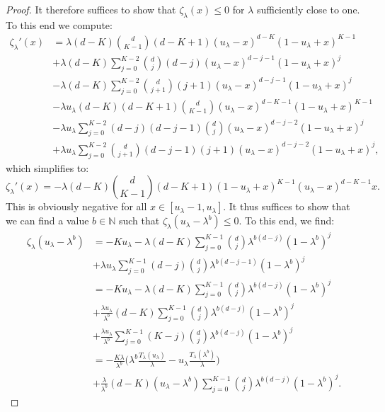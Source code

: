 \documentclass[12pt]{report}
\begin{document}
\begin{proof}
It therefore suffices to show that $\zeta_\lambda(x) \leq 0$ for $\lambda$ sufficiently close to one. To this end we compute:
\begin{align*}
\zeta_\lambda'(x)
&= \lambda (d-K) \binom{d}{K-1} (d-K+1) (u_\lambda - x)^{d-K} (1-u_\lambda+x)^{K-1}\\
&+ \lambda (d-K) \sum_{j=0}^{K-2} \binom{d}{j} (d-j) (u_\lambda - x)^{d-j-1} (1-u_\lambda + x)^j\\
&-\lambda (d-K) \sum_{j=0}^{K-2} \binom{d}{j+1} (j+1) (u_\lambda - x)^{d-j-1} (1-u_\lambda + x)^{j}\\
&- \lambda u_\lambda (d-K) (d-K+1) \binom{d}{K-1} (u_\lambda - x)^{d-K-1} (1-u_\lambda+x)^{K-1}\\
&-\lambda u_\lambda \sum_{j=0}^{K-2} (d-j) (d-j-1) \binom{d}{j} (u_\lambda -x)^{d-j-2} (1-u_\lambda+x)^j\\
&+ \lambda u_{\lambda} \sum_{j=0}^{K-2} \binom{d}{j+1} (d-j-1) (j+1) (u_\lambda - x)^{d-j-2} (1-u_\lambda +x)^j,
\end{align*}
which simplifies to:
\begin{equation} \label{eq:DzetaLam}
\zeta_\lambda'(x)=-\lambda (d-K) \binom{d}{K-1} (d-K+1) (1-u_\lambda+x)^{K-1} (u_\lambda-x)^{d-K-1} x.
\end{equation}
This is obviously negative for all $x \in [u_\lambda-1,u_\lambda]$. It thus suffices to show that we can find a value $b \in \mathbb{N}$ such that $\zeta_\lambda(u_\lambda-\lambda^b) \leq 0$. To this end, we find:
\begin{align*}
\zeta_\lambda(u_\lambda-\lambda^b)
&= -K u_\lambda - \lambda(d-K) \sum_{j=0}^{K-1} \binom{d}{j} \lambda^{b(d-j)} (1-\lambda^b)^j\\
&+\lambda u_\lambda \sum_{j=0}^{K-1} (d-j)  \binom{d}{j} \lambda^{b(d-j-1)} (1-\lambda^b)^j\\
&= -K u_\lambda - \lambda (d-K) \sum_{j=0}^{K-1} \binom{d}{j} \lambda^{b(d-j)} (1-\lambda^b)^j\\
&+ \frac{\lambda u_\lambda}{\lambda^b} (d-K) \sum_{j=0}^{K-1} \binom{d}{j} \lambda^{b(d-j)} (1-\lambda^b)^j\\
&+\frac{\lambda u_{\lambda}}{\lambda^b} \sum_{j=0}^{K-1} (K-j) \binom{d}{j} \lambda^{b(d-j)} (1-\lambda^b)^j\\
&= -\frac{K\lambda}{\lambda^b} \big(\lambda^b \frac{T_\lambda(u_\lambda)}{\lambda} - u_\lambda \frac{T_\lambda(\lambda^b)}{\lambda} \big)\\
&+ \frac{\lambda}{\lambda^b} (d-K) (u_\lambda - \lambda^b) \sum_{j=0}^{K-1} \binom{d}{j} \lambda^{b(d-j)} (1-\lambda^b)^j.

\end{align*}
\end{proof}
\end{document}
